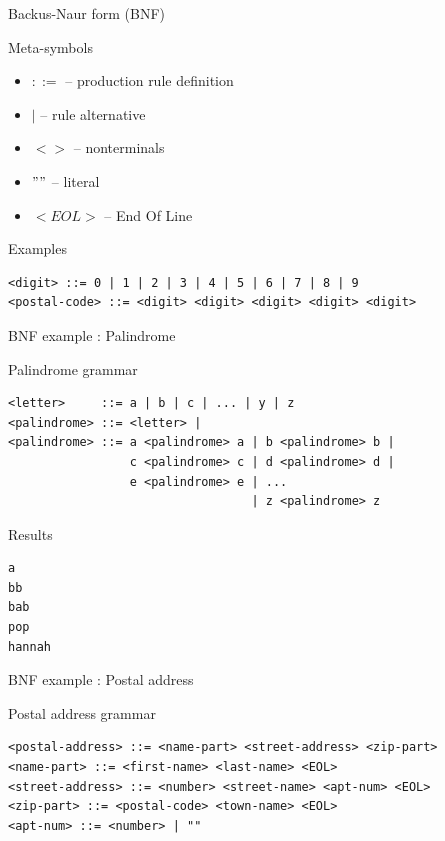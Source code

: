 \documentclass{beamer}
\begin{document}
\begin{frame}[fragile]{Backus-Naur form (BNF)}

\begin{block}{Meta-symbols}
\begin{itemize}
\item $::=$ -- production rule definition
\item $|$ -- rule alternative
\item $< >$ -- nonterminals
\item $""$ -- literal
\item $<EOL>$ -- End Of Line
\end{itemize}
\end{block}

\begin{exampleblock}{Examples}
\small
\begin{verbatim}
<digit> ::= 0 | 1 | 2 | 3 | 4 | 5 | 6 | 7 | 8 | 9
<postal-code> ::= <digit> <digit> <digit> <digit> <digit>
\end{verbatim}
\end{exampleblock}

\end{frame}

\begin{frame}[fragile]{BNF example : Palindrome}

\begin{exampleblock}{Palindrome grammar}
\begin{verbatim}
<letter>     ::= a | b | c | ... | y | z
<palindrome> ::= <letter> |
<palindrome> ::= a <palindrome> a | b <palindrome> b |
                 c <palindrome> c | d <palindrome> d | 
                 e <palindrome> e | ...
                                  | z <palindrome> z
\end{verbatim}
\end{exampleblock}

\begin{exampleblock}{Results}
\begin{verbatim}
a
bb
bab
pop
hannah
\end{verbatim}
\end{exampleblock}

\end{frame}

\begin{frame}[fragile]{BNF example : Postal address}
\begin{exampleblock}{Postal address grammar}\small
\begin{verbatim}
<postal-address> ::= <name-part> <street-address> <zip-part>
<name-part> ::= <first-name> <last-name> <EOL> 
<street-address> ::= <number> <street-name> <apt-num> <EOL>
<zip-part> ::= <postal-code> <town-name> <EOL>
<apt-num> ::= <number> | ""
\end{verbatim}
\end{exampleblock}
\end{frame}
\end{document}
